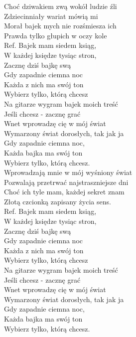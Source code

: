 
Choć dziwakiem zwą wokół ludzie źli \\
Zdziecinniały wariat mówią mi \\
Morał bajek mych nie rozśmiesza ich \\
Prawda tylko głupich w oczy kole \\
\hops
Ref. Bajek mam siedem ksiąg,\tab{} \\
 W każdej księdze tysiąc stron,  \\
 Zacznę dziś bajkę swą \tab{}\\
 Gdy zapadnie ciemna noc \\
 Każda z nich ma swój ton \\
 Wybierz tylko, którą chcesz \\
 Na gitarze wygram bajek moich treść \\
 Jeśli chcesz - zacznę grać \tab{}\\
 Wnet wprowadzę cię w mój świat \\
 Wymarzony świat dorosłych, tak jak ja  \\
 Gdy zapadnie ciemna noc, \\
 Każda bajka ma swój ton \\
 Wybierz tylko, którą chcesz. \\
\hops
Wprowadzają mnie w mój wyśniony świat \\
Pozwalają przetrwać najstraszniejsze dni \\
Choć ich tyle mam, każdej sekret znam \\
Złotą czcionką zapisany życia sens. \\
\hops
Ref. Bajek mam siedem ksiąg,\\
 W każdej księdze tysiąc stron, \\
 Zacznę dziś bajkę swą \\
 Gdy zapadnie ciemna noc \\
 Każda z nich ma swój ton \\
 Wybierz tylko, którą chcesz \\
 Na gitarze wygram bajek moich treść \\
 Jeśli chcesz - zacznę grać \\
 Wnet wprowadzę cię w mój świat \\
 Wymarzony świat dorosłych, tak jak ja \\
 Gdy zapadnie ciemna noc, \\
 Każda bajka ma swój ton \\
 Wybierz tylko, którą chcesz. 